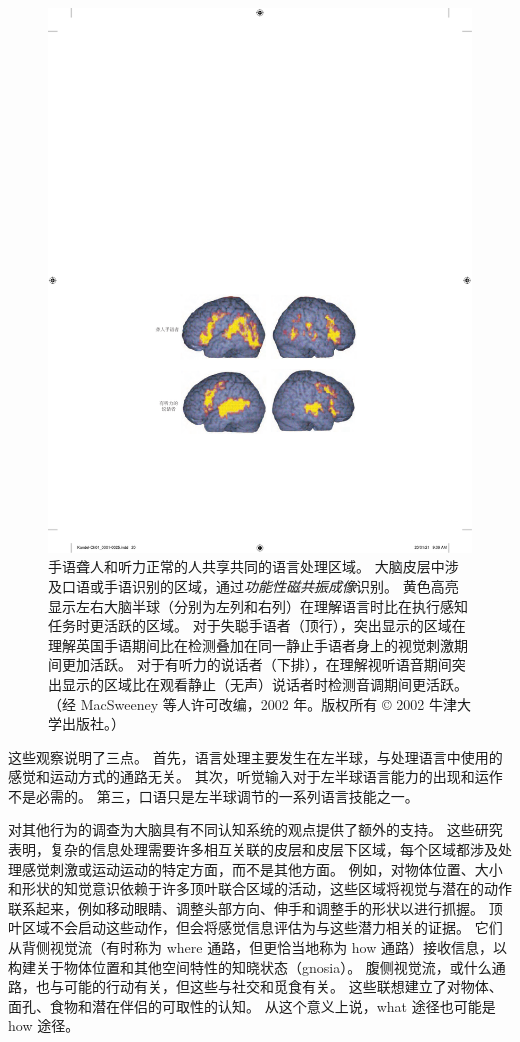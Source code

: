 \begin{figure}[htbp]
	\centering
	\includegraphics[width=0.5\linewidth]{chap01/fig_1_8}
	\caption{手语聋人和听力正常的人共享共同的语言处理区域。 大脑皮层中涉及口语或手语识别的区域，通过\textit{功能性磁共振成像}识别。 黄色高亮显示左右大脑半球（分别为左列和右列）在理解语言时比在执行感知任务时更活跃的区域。 对于失聪手语者（顶行），突出显示的区域在理解英国手语期间比在检测叠加在同一静止手语者身上的视觉刺激期间更加活跃。 对于有听力的说话者（下排），在理解视听语音期间突出显示的区域比在观看静止（无声）说话者时检测音调期间更活跃。 （经 MacSweeney 等人许可改编，2002 年。版权所有 © 2002 牛津大学出版社。）}
	\label{fig:1_8}
\end{figure}


这些观察说明了三点。 
首先，语言处理主要发生在左半球，与处理语言中使用的感觉和运动方式的通路无关。 
其次，听觉输入对于左半球语言能力的出现和运作不是必需的。 
第三，口语只是左半球调节的一系列语言技能之一。


对其他行为的调查为大脑具有不同认知系统的观点提供了额外的支持。 
这些研究表明，复杂的信息处理需要许多相互关联的皮层和皮层下区域，每个区域都涉及处理感觉刺激或运动运动的特定方面，而不是其他方面。 
例如，对物体位置、大小和形状的知觉意识依赖于许多顶叶联合区域的活动，这些区域将视觉与潜在的动作联系起来，例如移动眼睛、调整头部方向、伸手和调整手的形状以进行抓握。 
顶叶区域不会启动这些动作，但会将感觉信息评估为与这些潜力相关的证据。 
它们从背侧视觉流（有时称为 where 通路，但更恰当地称为 how 通路）接收信息，以构建关于物体位置和其他空间特性的知晓状态（gnosia）。 
腹侧视觉流，或什么通路，也与可能的行动有关，但这些与社交和觅食有关。 
这些联想建立了对物体、面孔、食物和潜在伴侣的可取性的认知。 
从这个意义上说，what 途径也可能是 how 途径。



